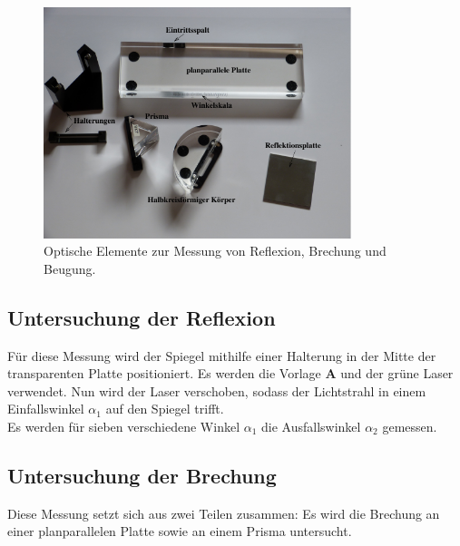     \begin{figure}
        \centering
        \includegraphics[width=0.8\textwidth]{content/img/Abb_4_compressed.pdf}
        \caption{Optische Elemente zur Messung von Reflexion, Brechung und Beugung. \cite{versuchsanleitung}}
        \label{fig:aufbau_elemente}
    \end{figure}


\FloatBarrier
\subsection{Untersuchung der Reflexion}

    Für diese Messung wird der Spiegel mithilfe einer Halterung in der Mitte der transparenten Platte positioniert.
    Es werden die Vorlage \textbf{A} und der grüne Laser verwendet.
    Nun wird der Laser verschoben,
    sodass der Lichtstrahl in einem Einfallswinkel $\alpha_1$ auf den Spiegel trifft.\\
    Es werden für sieben verschiedene Winkel $\alpha_1$ die Ausfallswinkel $\alpha_2$ gemessen.


\subsection{Untersuchung der Brechung}

    Diese Messung setzt sich aus zwei Teilen zusammen:
    Es wird die Brechung an einer planparallelen Platte sowie an einem Prisma untersucht.

